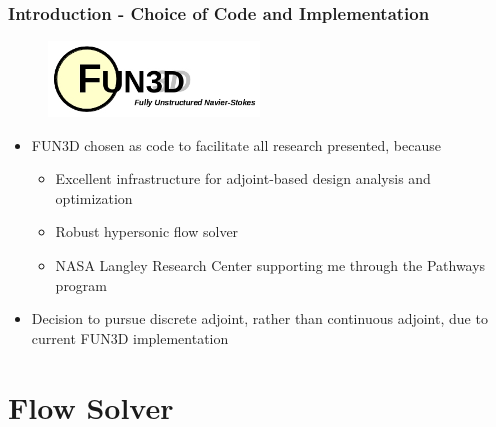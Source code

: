 \documentclass{beamer}
\begin{document}
\begin{frame}
  \vspace{-0.2cm}
  \frametitle{Introduction - Choice of Code and Implementation}
  \begin{figure}[ht]
    \centering
    \includegraphics[width=0.5\textwidth]{figures/fun3d_logo.png}
    \label{fig:fun3d}
  \end{figure}
  \begin{itemize}
    \item FUN3D chosen as code to facilitate all research presented, because
      \begin{itemize}
        \item Excellent infrastructure for adjoint-based design analysis and optimization
        \item Robust hypersonic flow solver
        \item NASA Langley Research Center supporting me through the Pathways
          program
      \end{itemize}
    \item Decision to pursue discrete adjoint, rather than continuous adjoint,
      due to current FUN3D implementation
  \end{itemize}
\end{frame}

\section{Flow Solver}
\end{document}
